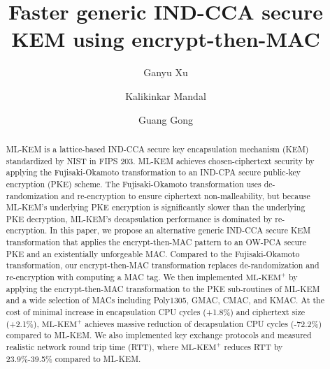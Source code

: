\documentclass[journal=tches,submission]{iacrtrans}
\author{
    Ganyu Xu\inst{1}
    \and Kalikinkar Mandal\inst{2}
    \and Guang Gong\inst{1}
}
\institute{
  University of Waterloo, Waterloo, Canada, \email{{g66xu,ggong}@uwaterloo.ca}
  \and
  University of New Brunswick, New Brunswick, Canada, \email{kmandal@unb.ca}
}
\title{Faster generic IND-CCA secure KEM using encrypt-then-MAC}
\def\mlkemplus{\text{ML-KEM}^+}
\begin{document}
\maketitle




\begin{abstract}
    ML-KEM is a lattice-based IND-CCA secure key encapsulation mechanism (KEM) standardized by NIST in FIPS 203. ML-KEM achieves chosen-ciphertext security by applying the Fujisaki-Okamoto transformation to an IND-CPA secure public-key encryption (PKE) scheme. The Fujisaki-Okamoto transformation uses de-randomization and re-encryption to ensure ciphertext non-malleability, but because ML-KEM's underlying PKE encryption is significantly slower than the underlying PKE decryption, ML-KEM's decapsulation performance is dominated by re-encryption. In this paper, we propose an alternative generic IND-CCA secure KEM transformation that applies the encrypt-then-MAC pattern to an OW-PCA secure PKE and an existentially unforgeable MAC. Compared to the Fujisaki-Okamoto transformation, our encrypt-then-MAC transformation replaces de-randomization and re-encryption with computing a MAC tag. We then implemented $\mlkemplus$ by applying the encrypt-then-MAC transformation to the PKE sub-routines of ML-KEM and a wide selection of MACs including Poly1305, GMAC, CMAC, and KMAC. At the cost of minimal increase in encapsulation CPU cycles (+1.8\%) and ciphertext size (+2.1\%), $\mlkemplus$ achieves massive reduction of decapsulation CPU cycles (-72.2\%) compared to ML-KEM. We also implemented key exchange protocols and measured realistic network round trip time (RTT), where $\mlkemplus$ reduces RTT by 23.9\%-39.5\% compared to ML-KEM.
\end{abstract}
\end{document}
